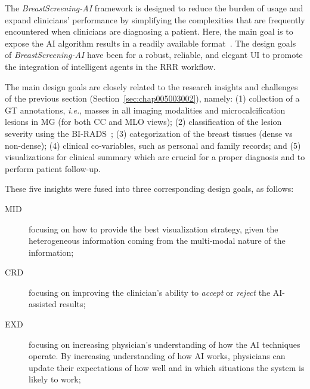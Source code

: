The {\it BreastScreening-AI} framework is designed to reduce the burden of usage and expand clinicians' performance by simplifying the complexities that are frequently encountered when clinicians are diagnosing a patient.
Here, the main goal is to expose the \ac{AI} algorithm results in a readily available format~\cite{CALISTO2022102285}.
The design goals of {\it BreastScreening-AI} have been for a robust, reliable, and elegant \ac{UI} to promote the integration of intelligent agents in the \ac{RRR} workflow.

The main design goals are closely related to the research insights and challenges of the previous section (Section~\ref{sec:chap005003002}), namely:
(1) collection of a \ac{GT} annotations, {\it i.e.}, masses in all imaging modalities and microcalcification lesions in \ac{MG} (for both \ac{CC} and \ac{MLO} views);
(2) classification of the lesion severity using the \ac{BI-RADS}~\cite{aghaei2018association};
(3) categorization of the breast tissues (dense vs non-dense);
(4) clinical co-variables, such as personal and family records; and
(5) visualizations for clinical summary which are crucial for a proper diagnosis and to perform patient follow-up.


\noindent
These five insights were fused into three corresponding design goals, as follows:

\vspace{1.00mm}

\begin{description}
\item[\ac{MID}] focusing on how to provide the best visualization strategy, given the heterogeneous information coming from the multi-modal nature of the information;

\vspace{0.50mm}

\item[\ac{CRD}] focusing on improving the clinician's ability to {\it accept} or {\it reject} the \ac{AI}-assisted results;

\vspace{0.50mm}

\item[\ac{EXD}] focusing on increasing physician's understanding of how the \ac{AI} techniques operate. By increasing understanding of how \ac{AI} works, physicians can update their expectations of how well and in which situations the system is likely to work;
\end{description}

